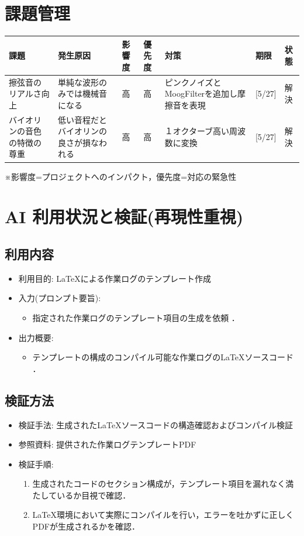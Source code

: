 \documentclass[uplatex,dvipdfmx]{jlreq}
\begin{document}
\section{課題管理}
\begin{table}[H]
    \centering
    \small
    \begin{tabular}{p{3cm}p{3cm}llp{3cm}ll}
        \toprule
        課題 & 発生原因 & 影響度 & 優先度 & 対策 & 期限 & 状態 \\
        \midrule
        擦弦音のリアルさ向上 & 単純な波形のみでは機械音になる & 高 & 高 & ピンクノイズとMoogFilterを追加し摩擦音を表現 & [5/27] & 解決 \\
        バイオリンの音色の特徴の尊重 & 低い音程だとバイオリンの良さが損なわれる & 高 & 高 & １オクターブ高い周波数に変換 & [5/27] & 解決 \\
        \bottomrule
    \end{tabular}
\end{table}
\vspace{0.5em}
\noindent ※影響度=プロジェクトへのインパクト，優先度=対応の緊急性

\section{AI 利用状況と検証(再現性重視)}
\subsection{利用内容}
\begin{itemize}
    \item 利用目的: \LaTeX による作業ログのテンプレート作成
    \item  入力(プロンプト要旨):
    \begin{itemize}
        \item 指定された作業ログのテンプレート項目の生成を依頼 ．
    \end{itemize}
    \item  出力概要:
    \begin{itemize}
        \item テンプレートの構成のコンパイル可能な作業ログの\LaTeX ソースコード ．
    \end{itemize}
\end{itemize}

\subsection{検証方法}
\begin{itemize}
    \item  検証手法: 生成された\LaTeX ソースコードの構造確認およびコンパイル検証
    \item  参照資料: 提供された作業ログテンプレートPDF
    \item  検証手順:
    \begin{enumerate}
        \item 生成されたコードのセクション構成が，テンプレート項目を漏れなく満たしているか目視で確認．
        \item \LaTeX 環境において実際にコンパイルを行い，エラーを吐かずに正しくPDFが生成されるかを確認．
    \end{enumerate}
\end{itemize}
\end{document}
